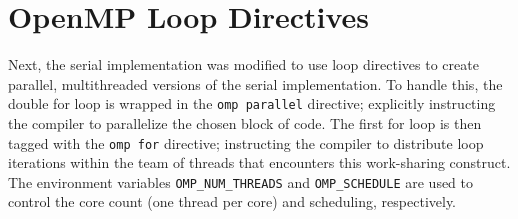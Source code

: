 \documentclass{article}
\begin{document}
\section{OpenMP Loop Directives}
Next, the serial implementation was modified to use loop directives to create parallel, 
multithreaded versions of the serial implementation. To handle this, the double 
for loop is wrapped in the \texttt{omp parallel} directive; explicitly instructing 
the compiler to parallelize the chosen block of code. The first for loop is then tagged 
with the \texttt{omp for} directive; instructing the compiler to distribute loop 
iterations within the team of threads that encounters this work-sharing construct. The environment variables 
\texttt{OMP\_NUM\_THREADS} and \texttt{OMP\_SCHEDULE} are used to control the core count (one thread per core) 
and scheduling, respectively.
\end{document}
